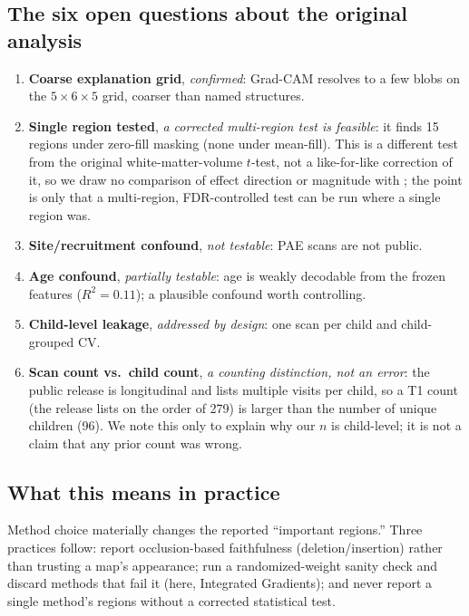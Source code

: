 \documentclass[11pt]{article}
\begin{document}
\subsection{The six open questions about the original analysis}
\label{sec:open}
\begin{enumerate}[leftmargin=1.6em]
\item \textbf{Coarse explanation grid}, \emph{confirmed}: Grad-CAM resolves to a few blobs on
the $5\times6\times5$ grid, coarser than named structures.
\item \textbf{Single region tested}, \emph{a corrected multi-region test is feasible}: it
finds 15 regions under zero-fill masking (none under mean-fill). This is a
different test from the original white-matter-volume $t$-test, not a like-for-like correction
of it, so we draw no comparison of effect direction or magnitude with \citet{das2024}; the
point is only that a multi-region, FDR-controlled test can be run where a single region was.
\item \textbf{Site/recruitment confound}, \emph{not testable}: PAE scans are not public.
\item \textbf{Age confound}, \emph{partially testable}: age is weakly decodable from the frozen
features ($R^2=0.11$); a plausible confound worth controlling.
\item \textbf{Child-level leakage}, \emph{addressed by design}: one scan per child and
child-grouped CV.
\item \textbf{Scan count vs.\ child count}, \emph{a counting distinction, not an error}: the
public release is longitudinal and lists multiple visits per child, so a T1 count (the
release lists on the order of 279) is larger than the number of unique children (96). We note
this only to explain why our $n$ is child-level; it is not a claim that any prior count was
wrong.
\end{enumerate}

\subsection{What this means in practice}
Method choice materially changes the reported ``important regions.'' Three practices follow:
report occlusion-based faithfulness (deletion/insertion) rather than trusting a map's
appearance; run a randomized-weight sanity check and discard methods that fail it (here,
Integrated Gradients); and never report a single method's regions without a corrected
statistical test.
\end{document}
